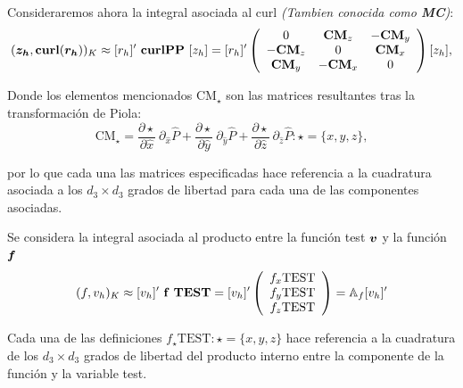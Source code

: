 \documentclass{article}
\begin{document}
\noindent Consideraremos ahora la integral asociada al curl \textit{(Tambien conocida como \textbf{MC})}:
\begin{align}
\label{eq:5}
    (\boldsymbol{z_h}, \textbf{\textup{curl}}(\boldsymbol{r_h}))_K \approx
    [r_h]'~\mathbf{curlPP}~[z_h] =
    [r_h]'
    \left(
    \begin{array}{ccc}
        0 & \mathbf{CM}_z & -\mathbf{CM}_y\\
        -\mathbf{CM}_z & 0 & \mathbf{CM}_x \\
        \mathbf{CM}_y & -\mathbf{CM}_x & 0 \\
    \end{array}
    \right)
    [z_h],
\end{align}

\noindent Donde los elementos mencionados $\mathrm{CM}_\star$ son las matrices resultantes tras la transformación de Piola:
\begin{equation*}
\mathrm{CM}_\star = \frac{\partial \star}{\partial \hat{x}}~\partial_{\hat{x}}\hat{P} + \frac{\partial \star}{\partial \hat{y}}~\partial_{\hat{y}}\hat{P} + \frac{\partial \star}{\partial \hat{z}}~ \partial_{\hat{z}}\hat{P} : \star = \lbrace x, y, z \rbrace,
\end{equation*}

\noindent por lo que cada una las matrices especificadas hace referencia a la cuadratura asociada a los $d_3 \times d_3$ grados de libertad para cada una de las componentes asociadas.

\noindent Se considera la integral asociada al producto entre la función test $\boldsymbol{v}$ y la función $\boldsymbol{f}$
\begin{align}
    (f, v_h)_K \approx
    [v_h]'~\mathbf{f~TEST} =
    [v_h]'
    \left(
    \begin{array}{ccc}
       f_x\text{TEST}\\
       f_y\text{TEST}\\
       f_z\text{TEST}\\
    \end{array}
    \right) =
    \mathbb{A}_f
    [v_h]'
\end{align}

\noindent Cada una de las definiciones $f_\star \text{TEST} : \star = \lbrace x, y, z \rbrace$ hace referencia a la cuadratura de los $d_3 \times d_3$ grados de libertad del producto interno entre la componente de la función y la variable test.
\end{document}
